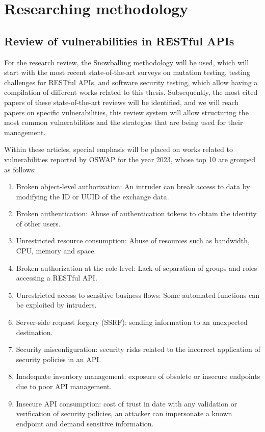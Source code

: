\section{Researching methodology}

\subsection{ Review of vulnerabilities in RESTful APIs} 

For the research review, the Snowballing methodology\cite{Chaim2008}  will be used, which will start with the most recent state-of-the-art surveys on mutation testing\cite{Papadakis2019}, testing challenges for RESTful APIs\cite{Ehsan2022}, and software security testing\cite{Golmohammadi2023}, which allow having a compilation of different works related to this thesis. Subsequently, the most cited papers of these state-of-the-art reviews will be identified, and we will reach papers on specific vulnerabilities, this review system will allow structuring the most common vulnerabilities and the strategies that are being used for their management.

Within these articles, special emphasis will be placed on works related to vulnerabilities reported by OSWAP for the year 2023, whose top 10 are grouped as follows:


\begin{enumerate}
    \item Broken object-level authorization: An intruder can break access to data by modifying the ID or UUID of the exchange data.
    \item Broken authentication: Abuse of authentication tokens to obtain the identity of other users.
    \item Unrestricted resource consumption: Abuse of resources such as bandwidth, CPU, memory and space.
    \item Broken authorization at the role level: Lack of separation of groups and roles accessing a RESTful API.
    \item Unrestricted access to sensitive business flows: Some automated functions can be exploited by intruders.
    \item Server-side request forgery (SSRF): sending information to an unexpected destination.
    \item Security misconfiguration: security risks related to the incorrect application of security policies in an API.
    \item Inadequate inventory management: exposure of obsolete or insecure endpoints due to poor API management.
    \item Insecure API consumption: cost of trust in date with any validation or verification of security policies, an attacker can impersonate a known endpoint and demand sensitive information.
\end{enumerate}


